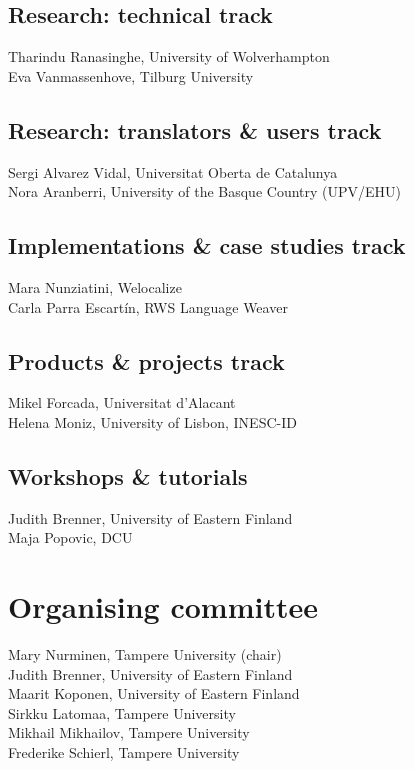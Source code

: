 \documentclass[a4paper,11pt,twoside]{book}
\begin{document}
\subsection*{Research: technical track}
\noindent Tharindu Ranasinghe, University of Wolverhampton\\
\noindent Eva Vanmassenhove, Tilburg University

\subsection*{Research: translators \& users track}
\noindent Sergi Alvarez Vidal, Universitat Oberta de Catalunya\\
\noindent Nora Aranberri, University of the Basque Country (UPV/EHU)

\subsection*{Implementations \& case studies track}
\noindent Mara Nunziatini, Welocalize\\
\noindent Carla Parra Escartín, RWS Language Weaver

\subsection*{Products \& projects track}
\noindent Mikel Forcada, Universitat d’Alacant\\
\noindent Helena Moniz, University of Lisbon, INESC-ID

\subsection*{Workshops \& tutorials}
\noindent Judith Brenner, University of Eastern Finland\\
\noindent Maja Popovic, DCU

\section*{Organising committee}
\noindent Mary Nurminen, Tampere University (chair)\\
\noindent Judith Brenner, University of Eastern Finland\\
\noindent Maarit Koponen, University of Eastern Finland\\
\noindent Sirkku Latomaa, Tampere University\\
\noindent Mikhail Mikhailov, Tampere University\\
\noindent Frederike Schierl, Tampere University\\
\end{document}
